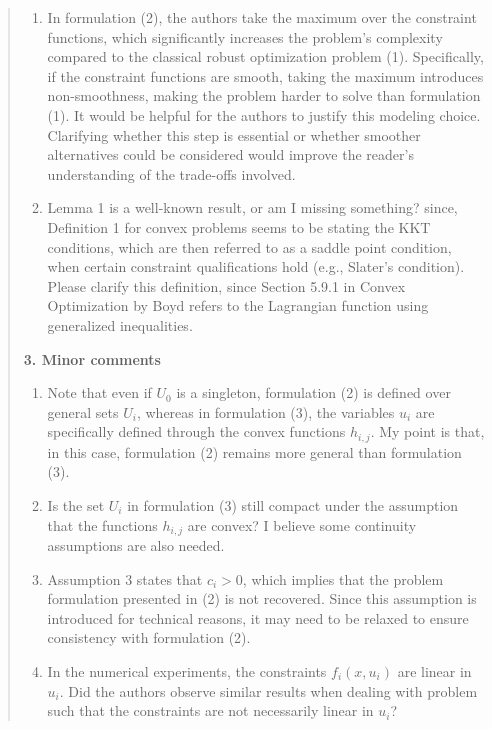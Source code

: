 \documentclass[journal,twoside,web]{ieeecolor}
\begin{document}
\begin{quote}
\begin{enumerate}
\item In formulation (2), the authors take the maximum over the constraint functions, which significantly increases the problem's complexity compared to the classical robust optimization problem (1). Specifically, if the constraint functions are smooth, taking the maximum introduces non-smoothness, making the problem harder to solve than formulation (1). It would be helpful for the authors to justify this modeling choice. Clarifying whether this step is essential or whether smoother alternatives could be considered would improve the reader's understanding of the trade-offs involved.

\item Lemma 1 is a well-known result, or am I missing something? since, Definition 1 for convex problems seems to be stating the KKT conditions, which are then referred to as a saddle point condition, when certain constraint qualifications hold (e.g., Slater's condition). Please clarify this definition, since Section 5.9.1 in Convex Optimization by Boyd refers to the Lagrangian function using generalized inequalities.
\end{enumerate}

\textbf{3. Minor comments}

\begin{enumerate}[resume]
\item Note that even if $U_0$ is a singleton, formulation (2) is defined over general sets $U_i$, whereas in formulation (3), the variables $u_i$ are specifically defined through the convex functions $h_{i,j}$. My point is that, in this case, formulation (2) remains more general than formulation (3).

\item Is the set $U_i$ in formulation (3) still compact under the assumption that the functions $h_{i,j}$ are convex? I believe some continuity assumptions are also needed.

\item Assumption 3 states that $c_i > 0$, which implies that the problem formulation presented in (2) is not recovered. Since this assumption is introduced for technical reasons, it may need to be relaxed to ensure consistency with formulation (2).

\item In the numerical experiments, the constraints $f_i(x, u_i)$ are linear in $u_i$. Did the authors observe similar results when dealing with problem such that the constraints are not necessarily linear in $u_i$?
\end{enumerate}
\end{quote}
\end{document}

